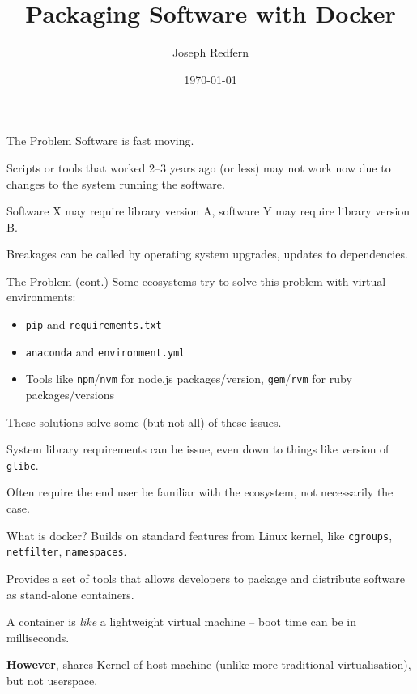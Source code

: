 \documentclass[10pt]{beamer}
\title{Packaging Software with Docker}
\date{\today}
\author{Joseph Redfern}
\begin{document}
\maketitle

\begin{frame}[fragile]{The Problem}
	\vfill Software is fast moving. 

	\vfill Scripts or tools that worked 2--3 years ago (or less) may not work now due to changes to the system running the software.

	\vfill Software X may require library version A, software Y may require library version B.

	\vfill Breakages can be called by operating system upgrades, updates to dependencies.

\end{frame}

\begin{frame}[fragile]{The Problem (cont.)}
	\vfill Some ecosystems try to solve this problem with virtual environments:

	\vfill \begin{itemize}
	\item \verb|pip| and \verb|requirements.txt| 
	\item \verb|anaconda| and \verb|environment.yml|
	\item Tools like \verb|npm|/\verb|nvm| for node.js packages/version, \verb|gem|/\verb|rvm| for ruby packages/versions
	\end{itemize}

	\vfill These solutions solve some (but not all) of these issues.

	System library requirements can be issue, even down to things like version of \verb|glibc|.

	Often require the end user be familiar with the ecosystem, not necessarily the case.
\end{frame}

\begin{frame}[fragile]{What is docker?}
	\vfill Builds on standard features from Linux kernel, like \verb|cgroups|, \verb|netfilter|, \verb|namespaces|.

	\vfill Provides a set of tools that allows developers to package and distribute software as stand-alone containers.

	\vfill A container is \textit{like} a lightweight virtual machine -- boot time can be in milliseconds.

	\vfill \textbf{However}, shares Kernel of host machine (unlike more traditional virtualisation), but not userspace.

\end{frame}
\end{document}
